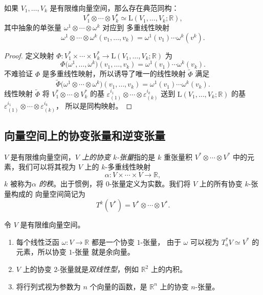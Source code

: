 \documentclass[fontset=none]{Notes}
\newcommand{\LL}{{\mathrm{L}}}
\begin{document}
\begin{proposition}
  如果 $V_1,\dots,V_k$ 是有限维向量空间，那么存在典范同构：
  \[
    V_1^*\otimes \cdots\otimes V_k^*\simeq \LL(V_1,\dots,V_k;\mathbb{R}),
  \]
  其中抽象的单张量 $\omega^1\otimes \cdots\otimes\omega^k$ 对应到
  多重线性映射
  \[
    \omega^1\otimes\cdots\otimes\omega^k(v_1,\dots,v_k)=
    \omega^1(v_1)\cdots \omega^k(v^k).  
  \]
\end{proposition}
\begin{proof}
  定义映射 $\varPhi:V_1^*\times\cdots\times V_k^*\to \LL(V_1,\dots,V_k;\mathbb{R})$
  为
  \[
    \varPhi\bigl(\omega^1,\dots,\omega^k\bigr)(v_1,\dots,v_k)
    =\omega^1(v_1)\cdots\omega^k(v_k).
  \]
  不难验证 $\varPhi$ 是多重线性映射，所以诱导了唯一的线性映射 
  $\tilde{\varPhi}$ 满足
  \[
    \tilde\varPhi\bigl(\omega^1\otimes\cdots\otimes\omega^k\bigr)(v_1,\dots,v_k)
    =\omega^1(v_1)\cdots\omega^k(v_k).
  \]
  线性映射 $\tilde{\varPhi}$ 将 $V_1^*\otimes\cdots\otimes V_k^*$ 的基 $\varepsilon_{(1)}^{i_1}\otimes\cdots\otimes \varepsilon_{(k)}^{i_k}$
  送到 $\LL(V_1,\dots,V_k;\mathbb{R})$ 的基  $\varepsilon_{(1)}^{i_1}\otimes\cdots\otimes \varepsilon_{(k)}^{i_k}$，
  所以是同构映射。
\end{proof}

\subsection{向量空间上的协变张量和逆变张量}

$V$ 是有限维向量空间，\emph{$V$ 上的协变 $k$-张量}指的是
$k$ 重张量积 $V^*\otimes\cdots\otimes V^*$ 中的元素，我们可以将其视为
$V$ 上的 $k$-多重线性映射
\[
  \alpha:V\times\cdots\times V\to \mathbb{R},
\]
$k$ 被称为\emph{$\alpha$ 的秩}。出于惯例，将 $0$-张量定义为实数。我们将 $V$ 上的所有协变 $k$-张量构成的
向量空间简记为
\[
  T^k(V^*)=V^*\otimes\cdots\otimes V^*.
\]

\begin{example}[协变张量]
  令 $V$ 是有限维向量空间。
  \begin{enumerate}
    \item 每个线性泛函 $\omega:V\to \mathbb{R}$ 都是一个协变 $1$-张量，
    由于 $\omega$ 可以视为 $T_a^*V\simeq V^*$ 的元素，所以协变 $1$-张量
    就是余向量。
    \item $V$ 上的协变 $2$-张量就是\emph{双线性型}，例如 $\mathbb{R}^2$
    上的内积。
    \item 将行列式视为参数为 $n$ 个向量的函数，是 $\mathbb{R}^n$ 上的协变 $n$-张量。
  \end{enumerate}
\end{example}
\end{document}
